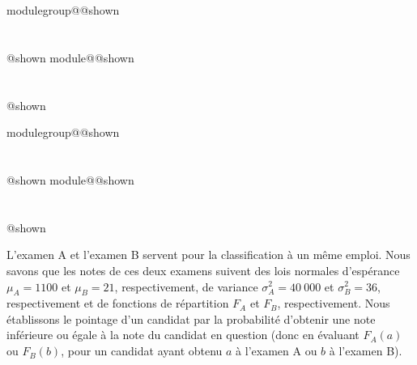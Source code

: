 \documentclass{Evaluation}
\makeatletter
\newcommand{\currentmodulekey}{}
\newcommand{\currentmoduletitle}{}
\newcommand{\currentgroupkey}{}
\newcommand{\currentgrouptitle}{}
\newcommand{\showmoduleifneeded}{%
  \ifx\currentgroupkey\empty\else
    \expandafter\ifx\csname modulegroup@\currentgroupkey @shown\endcsname\relax
      \section*{\currentgrouptitle}%
      \expandafter\gdef\csname modulegroup@\currentgroupkey @shown\endcsname{1}%
    \fi
  \fi
  \expandafter\ifx\csname module@\currentmodulekey @shown\endcsname\relax
    \section*{\currentmoduletitle}%
    \expandafter\gdef\csname module@\currentmodulekey @shown\endcsname{1}%
  \fi
}
\newenvironment{H23}{\showmoduleifneeded}{}
\newenvironment{A23}{\showmoduleifneeded}{}
\makeatother
\begin{document}
\begin{questions}
\begin{H23}
\end{H23}

\begin{A23}
\question {} %
L'examen A et l'examen B servent pour la classification à un même emploi. 
Nous savons que les notes de ces deux examens suivent des lois normales d'espérance $\mu_{A}=1100$ et $\mu_{B}=21$, respectivement, de variance $\sigma^2_{A}=40\ 000$ et $\sigma^2_{B}=36$, respectivement et de fonctions de répartition $F_A$ et $F_B$, respectivement.
Nous établissons le pointage d'un candidat par la probabilité d'obtenir une note inférieure ou égale à la note du candidat en question (donc en évaluant $F_A(a)$ ou $F_B(b)$, pour un candidat ayant obtenu $a$ à l'examen A ou $b$ à l'examen B). 


\end{A23}
\end{questions}
\end{document}
